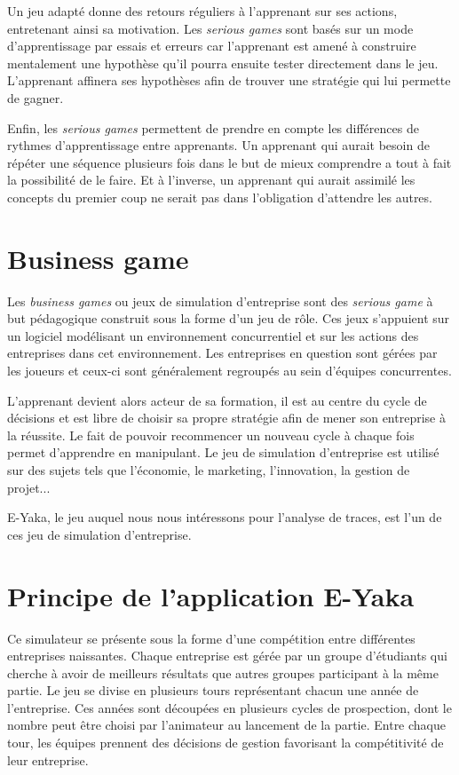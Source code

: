 Un jeu adapté donne des retours réguliers à l’apprenant sur ses actions, entretenant ainsi sa motivation. Les \emph{serious games} sont basés sur un mode d’apprentissage par essais et erreurs car l’apprenant est amené à construire mentalement une hypothèse qu’il pourra ensuite tester directement dans le jeu. L’apprenant affinera ses hypothèses afin de trouver une stratégie qui lui permette de gagner.

Enfin, les \emph{serious games} permettent de prendre en compte les différences de rythmes d’apprentissage entre apprenants. Un apprenant qui aurait besoin de répéter une séquence plusieurs fois dans le but de mieux comprendre a tout à fait la possibilité de le faire. Et à l’inverse, un apprenant qui aurait assimilé les concepts du premier coup ne serait pas dans l’obligation d’attendre les autres.

    \section{Business game}

Les \emph{business games} ou jeux de simulation d’entreprise sont des \emph{serious game} à but pédagogique construit sous la forme d’un jeu de rôle. Ces jeux s’appuient sur un logiciel modélisant un environnement concurrentiel et sur les actions des entreprises dans cet environnement. Les entreprises en question sont gérées par les joueurs et ceux-ci sont généralement regroupés au sein d’équipes concurrentes.

L’apprenant devient alors acteur de sa formation, il est au centre du cycle de décisions et est libre de choisir sa propre stratégie afin de mener son entreprise à la réussite. Le fait de pouvoir recommencer un nouveau cycle à chaque fois permet d’apprendre en manipulant. Le jeu de simulation d’entreprise est utilisé sur des sujets tels que l’économie, le marketing, l’innovation, la gestion de projet...

E-Yaka, le jeu auquel nous nous intéressons pour l’analyse de traces, est l'un de ces jeu de simulation d’entreprise.


    \section{Principe de l'application E-Yaka}

Ce simulateur se présente sous la forme d'une compétition entre différentes entreprises naissantes. Chaque entreprise est gérée par un groupe d'étudiants qui cherche à avoir de meilleurs résultats que autres groupes participant à la même partie. Le jeu se divise en plusieurs tours représentant chacun une année de l'entreprise. Ces années sont découpées en plusieurs cycles de prospection, dont le nombre peut être choisi par l'animateur au lancement de la partie. Entre chaque tour, les équipes prennent des décisions de gestion favorisant la compétitivité de leur entreprise.


